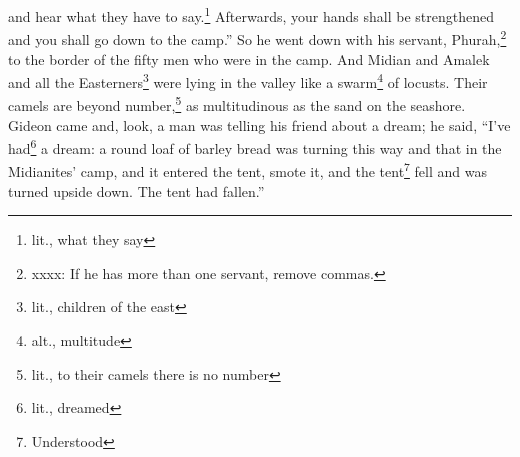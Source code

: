 \begin{inparaenum}
     and hear what they have to say.\footnote{lit., what they say} Afterwards, your hands shall be strengthened and you shall go down to the camp.'' So he went down with his servant, Phurah,\footnote{xxxx: If he has more than one servant, remove commas.} to the border of the fifty men who were in the camp.%
     And Midian and Amalek and all the Easterners\footnote{lit., children of the east} were lying in the valley like a swarm\footnote{alt., multitude} of locusts. Their camels are beyond number,\footnote{lit., to their camels there is no number} as multitudinous as the sand on the seashore.%
     Gideon came and, look, a man was telling his friend about a dream; he said, ``I've had\footnote{lit., dreamed} a dream: a round loaf of barley bread was turning this way and that in the Midianites' camp, and it entered the tent, smote it, and the tent\footnote{Understood} fell and was turned upside down. The tent had fallen.''%
\end{inparaenum}
